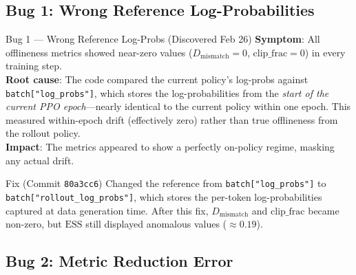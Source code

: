 \documentclass[11pt,a4paper]{article}
\begin{document}
\subsection{Bug 1: Wrong Reference Log-Probabilities}

\begin{bugbox}{Bug 1 --- Wrong Reference Log-Probs (Discovered Feb 26)}
\textbf{Symptom}: All offlineness metrics showed near-zero values
  ($D_{\mathrm{mismatch}} = 0$, $\mathrm{clip\_frac} = 0$) in every training step.\\[0.3em]
\textbf{Root cause}: The code compared the current policy's log-probs against
  \texttt{batch["log\_probs"]}, which stores the log-probabilities from the
  \emph{start of the current PPO epoch}---nearly identical to the current policy
  within one epoch. This measured within-epoch drift (effectively zero) rather
  than true offlineness from the rollout policy.\\[0.3em]
\textbf{Impact}: The metrics appeared to show a perfectly on-policy regime,
  masking any actual drift.
\end{bugbox}

\begin{fixbox}{Fix (Commit \texttt{80a3cc6})}
Changed the reference from \texttt{batch["log\_probs"]} to
  \texttt{batch["rollout\_log\_probs"]}, which stores the per-token
  log-probabilities captured at data generation time. After this fix,
  $D_{\mathrm{mismatch}}$ and $\mathrm{clip\_frac}$ became non-zero, but
  $\mathrm{ESS}$ still displayed anomalous values ($\approx 0.19$).
\end{fixbox}

\subsection{Bug 2: Metric Reduction Error}
\end{document}
